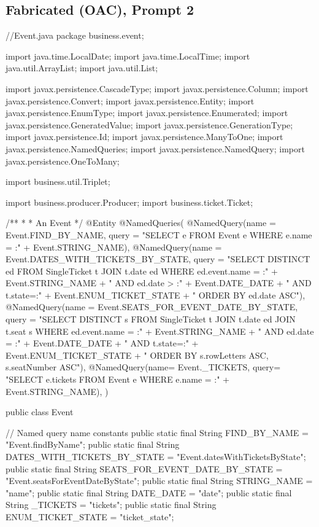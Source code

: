 \subsection{Fabricated (OAC), Prompt 2}

\begin{prompt}
  //Event.java
  package business.event;
  
  
  
  import java.time.LocalDate;
  import java.time.LocalTime;
  import java.util.ArrayList;
  import java.util.List;
  
  import javax.persistence.CascadeType;
  import javax.persistence.Column;
  import javax.persistence.Convert;
  import javax.persistence.Entity;
  import javax.persistence.EnumType;
  import javax.persistence.Enumerated;
  import javax.persistence.GeneratedValue;
  import javax.persistence.GenerationType;
  import javax.persistence.Id;
  import javax.persistence.ManyToOne;
  import javax.persistence.NamedQueries;
  import javax.persistence.NamedQuery;
  import javax.persistence.OneToMany;
  
  import business.util.Triplet;
  
  import business.producer.Producer;
  import business.ticket.Ticket;
  
  /**
   * 
   * An Event
   */
  @Entity
  @NamedQueries({
      @NamedQuery(name = Event.FIND_BY_NAME, query = "SELECT e FROM Event e WHERE e.name = :" + Event.STRING_NAME),
      @NamedQuery(name = Event.DATES_WITH_TICKETS_BY_STATE, query = "SELECT DISTINCT ed FROM SingleTicket t JOIN t.date ed WHERE ed.event.name = :"
          + Event.STRING_NAME + " AND ed.date > :" + Event.DATE_DATE
          + " AND t.state=:" + Event.ENUM_TICKET_STATE + " ORDER BY ed.date ASC"),
      @NamedQuery(name = Event.SEATS_FOR_EVENT_DATE_BY_STATE, query = "SELECT DISTINCT s FROM SingleTicket t JOIN t.date ed JOIN t.seat s WHERE ed.event.name = :"
          + Event.STRING_NAME + " AND ed.date = :" + Event.DATE_DATE
          + " AND t.state=:" + Event.ENUM_TICKET_STATE + " ORDER BY s.rowLetters ASC, s.seatNumber ASC"),
      @NamedQuery(name= Event._TICKETS, query= "SELECT e.tickets FROM Event e WHERE e.name = :" + Event.STRING_NAME),
      })
  
  public class Event {
  
    // Named query name constants
    public static final String FIND_BY_NAME = "Event.findByName";
    public static final String DATES_WITH_TICKETS_BY_STATE = "Event.datesWithTicketsByState";
    public static final String SEATS_FOR_EVENT_DATE_BY_STATE = "Event.seatsForEventDateByState";
    public static final String STRING_NAME = "name";
    public static final String DATE_DATE = "date";
    public static final String _TICKETS = "tickets";
    public static final String ENUM_TICKET_STATE = "ticket_state";
  
}
\end{prompt}
